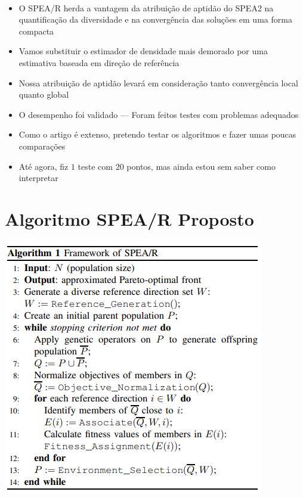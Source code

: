 \documentclass{rbfin}
\begin{document}
\newpage

$\,$

\vspace{60mm}

\begin{itemize}
  \item O SPEA/R herda a vantagem da atribuição de aptidão do SPEA2 na quantificação da diversidade e na convergência das soluções em uma forma compacta
  \item Vamos substituir o estimador de densidade mais demorado por uma estimativa baseada em direção de referência
  \item Nossa atribuição de aptidão levará em consideração tanto convergência local quanto global
  \item O desempenho foi validado --- Foram feitos testes com problemas adequados
  \item Como o artigo é extenso, pretendo testar os algoritmos e fazer umas poucas comparações
  \item Até agora, fiz $1$ teste com $20$ pontos, mas ainda estou sem saber como interpretar
\end{itemize}

\newpage
\section{Algoritmo SPEA/R Proposto}

\vspace{6mm}

\begin{center}
\includegraphics[scale=1]{alg1}
\end{center}
\end{document}
